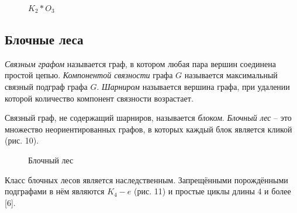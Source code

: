 \documentclass[12pt]{article}
\begin{document}
\begin{figure}
	\caption{$K_2*O_3$}
\end{figure}

\subsection{Блочные леса}

{\it Связным графом} называется граф, в котором любая пара вершин соединена простой цепью.
{\it Компонентой связности} графа $G$ называется максимальный связный подграф графа  $G$.
{\it Шарниром} называется вершина графа, при удалении которой количество компонент связности возрастает.

Связный граф, не содержащий шарниров, называется {\it блоком}.
{\it Блочный лес} -- это множество неориентированных графов, в которых каждый блок является кликой (рис. 10).

\begin{figure}
	\label{pic9}
	\caption{Блочный лес}
\end{figure}

Класс блочных лесов является наследственным. Запрещёнными порождёнными подграфами в нём являются $K_4 - e$ (рис. 11) и простые циклы длины 4 и более [6].
\end{document}
